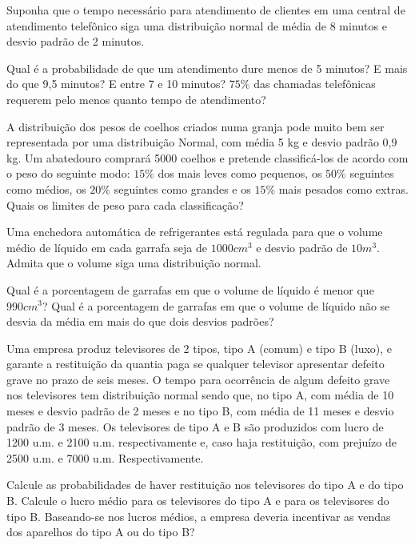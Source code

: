 \documentclass{report}
\begin{document}
\begin{Exercise}
\Question Suponha que o tempo necessário para atendimento de clientes em uma central de atendimento telefônico siga uma distribuição normal de média de 8 minutos 
e desvio padrão de 2 minutos.
\begin{tasks}
\task Qual é a probabilidade de que um atendimento dure menos de 5 minutos?
\task E  mais do que 9,5 minutos?
\task E entre 7 e 10 minutos?
\task $75\%$ das chamadas telefônicas requerem pelo menos quanto tempo de atendimento?
\end{tasks}

\Question A distribuição dos pesos de coelhos criados numa granja pode muito bem ser representada por uma distribuição Normal, com média 5 kg e desvio padrão 0,9 kg. 
Um abatedouro comprará 5000 coelhos e pretende classificá-los de acordo com o peso do seguinte modo: $15\%$ dos mais leves como pequenos, os $50\%$ seguintes 
como médios, os $20\%$ seguintes como grandes e os $15\%$ mais pesados como extras. Quais os limites de peso para cada classificação?

\Question Uma enchedora automática de refrigerantes está regulada para que o volume médio de líquido em cada garrafa seja de $1000 cm^{3}$ e desvio padrão de $10 m^{3}$. 
Admita que o volume siga uma distribuição normal.
\begin{tasks}
\task Qual é a porcentagem de garrafas em que o volume de líquido é menor que $990 cm^{3}$?
\task Qual é a porcentagem de garrafas em que o volume de líquido não se desvia da média em mais do que dois desvios padrões?
\end{tasks}

\Question Uma empresa produz televisores de 2 tipos, tipo A (comum) e tipo B (luxo), e garante a restituição da quantia paga se qualquer televisor apresentar defeito 
grave no prazo de seis meses. O tempo para ocorrência de algum defeito grave nos televisores tem distribuição normal sendo que, no tipo A, com média de 10 meses 
e desvio padrão de 2 meses e no tipo B, com média de 11 meses e desvio padrão de 3 meses. Os televisores de tipo A e B são produzidos com lucro  de 1200 u.m. e 
2100 u.m. respectivamente e, caso haja restituição, com prejuízo de 2500 u.m. e 7000 u.m. Respectivamente.
\begin{tasks}
\task Calcule as probabilidades de haver restituição nos televisores do tipo A e do tipo B.
\task Calcule o lucro médio para os televisores do tipo A e para os televisores do tipo B.
\task Baseando-se nos lucros médios, a empresa deveria incentivar as vendas dos aparelhos do tipo A ou do tipo B?
\end{tasks}


\end{Exercise}
\end{document}
